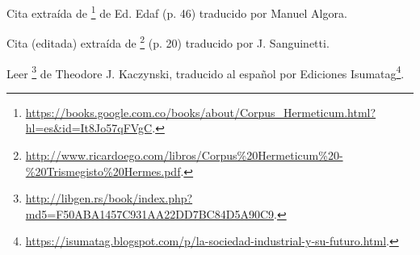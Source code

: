 \documentclass{article}
\begin{document}
	\begin{thebibliography}{9}
		 Cita extraída de
		\footnote{\url{https://books.google.com.co/books/about/Corpus_Hermeticum.html?hl=es&id=It8Jo57qFVgC}.}
		de Ed. Edaf (p. 46) traducido por Manuel Algora.

		 Cita (editada) extraída de
		\footnote{\url{http://www.ricardoego.com/libros/Corpus\%20Hermeticum\%20-\%20Trismegisto\%20Hermes.pdf}.}
		(p. 20) traducido por J. Sanguinetti.

		 Leer
		\footnote{\url{http://libgen.rs/book/index.php?md5=F50ABA1457C931AA22DD7BC84D5A90C9}.}
		de Theodore J. Kaczynski, traducido al español por Ediciones
		Isumatag\footnote{\url{https://isumatag.blogspot.com/p/la-sociedad-industrial-y-su-futuro.html}.}.
	\end{thebibliography}
\end{document}
